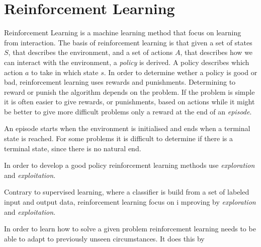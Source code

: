 \documentclass[11pt]{article}
\begin{document}
\maketitle

\section{Reinforcement Learning}

Reinforcement Learning is a machine learning method that focus on learning from interaction.
The basis of reinforcement learning is that given a set of states $S$, that describes the environment,
and a set of actions $A$, that describes how we can interact with the environment,
a \textit{policy} is derived.
A policy describes which action $a$ to take in which state $s$.
In order to determine wether a policy is good or bad, reinforcement learning uses
rewards and punishments.
Determining to reward or punish the algorithm depends on the problem.
If the problem is simple it is often easier to give rewards, or punishments, based on actions
while it might be better to give more difficult problems only a reward at the end of an \textit{episode}.

An episode starts when the environment is initialised and ends when a terminal state is reached.
For some problems it is difficult to determine if there is a terminal state, since there
is no natural end.

In order to develop a good policy reinforcement learning methods use \textit{exploration} and \textit{exploitation}.

Contrary to supervised learning, where a classifier is build from a set of labeled input and output data,
reinforcement learning focus on i mproving by \textit{exploration} and \textit{exploitation}.

In order to learn how to solve a given problem reinforcement learning needs to be able to
adapt to previously unseen circumstances.
It does this by 




%
%
\end{document}
